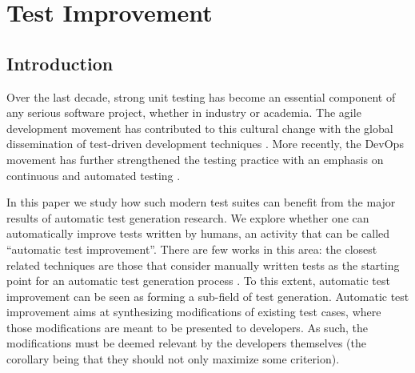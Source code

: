 \chapter{Test Improvement}

\begin{center}
	\begin{mdframed}
		\large
	\end{mdframed}
\end{center}

\minitoc

\graphicspath{{.}{chapitres/test-improvement//}}

\section{Introduction}

Over the last decade, strong unit testing has become an essential component of any serious software project, whether in industry or academia. The agile development movement has contributed to this cultural change with the global dissemination of test-driven development techniques \cite{beck2003test}.
More recently, the DevOps movement has further strengthened the testing practice with an emphasis on continuous and automated testing \cite{Roche2013Devops}. 

In this paper we study how such modern test suites can benefit from the major results of automatic test generation research.
We explore whether one can automatically improve tests written by humans, an activity that can be called ``automatic test improvement''. 
There are few works in this area: the closest related techniques are those that consider manually written tests as the starting point for an automatic test generation process \cite{Harder03,fraser2012seed,Xuan:2014:TCP:2635868.2635906,Yoo:2012:TDR:2237756.2237758,danglot2017emerging,Xuan:2015:CRV:2786805.2803206}. To this extent, automatic test improvement can be seen as forming a sub-field of test generation.
Automatic test improvement aims at synthesizing modifications of existing test cases, where those modifications are meant to be presented to developers. As such, the modifications must be deemed relevant by the developers themselves (the corollary being that they should not only maximize some criterion). 

